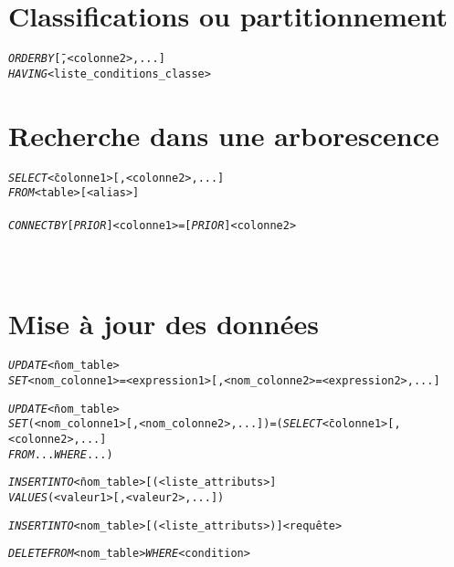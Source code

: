 \documentclass[10pt]{article}
\begin{document}
	\section{Classifications ou partitionnement}
		\begin{alltt}
			\begin{tabbing}
				\emph{ORDER BY}  \=<colonne1> [, <colonne2>,...]\\
				\emph{HAVING} 	\><liste_conditions_classe>
			\end{tabbing}
		\end{alltt}
		
	\section{Recherche dans une arborescence}
		\begin{alltt}
			\begin{tabbing}
				\emph{SELECT} \= <colonne1> [, <colonne2>, ...]\\
				\emph{FROM}   \> <table> [<alias>]\\
				[\emph{WHERE} \> <liste_conditions>]\\
				\emph{CONNECT BY} [\emph{PRIOR}] <colonne1> = [\emph{PRIOR}] <colonne2>\\
				[\emph{AND}	\> <condition_hierarchique>]\\
				[\emph{START WITH}\> <condition_depart>]\\
				[\emph{ORDER BY LEVEL}]
			\end{tabbing}
		\end{alltt}
		
	\section{Mise à jour des données}
		\begin{alltt}
			\begin{tabbing}
				\emph{UPDATE} \= <nom_table>\\
				\emph{SET} \> <nom_colonne1> = <expression1> [, <nom_colonne2> = <expression2>,...]\\
				[\emph{WHERE} \> <condition_selection>]
			\end{tabbing}
			\begin{tabbing}
				\emph{UPDATE} \= <nom_table>\\
				\emph{SET} \> (<nom_colonne1>[, <nom_colonne2>, ...]) = (\emph{SELECT} \= <colonne1>[,<colonne2>,...]\\
					\> \> \emph{FROM} ... \emph{WHERE} ...)\\
				[\emph{WHERE} \> <condition_selection>]
			\end{tabbing}
			\begin{tabbing}
				\emph{INSERT INTO} \= <nom_table> [(<liste_attributs>]\\
				\emph{VALUES} \> (<valeur1>[,<valeur2>,...])
			\end{tabbing}
			\emph{INSERT INTO} <nom_table> [(<liste_attributs>)] <requête>
			
			\emph{DELETE FROM} <nom_table> \emph{WHERE} <condition>
		\end{alltt}
\end{document}
